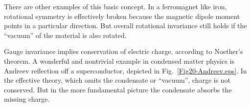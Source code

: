 \documentclass[12pt]{iopart}
\begin{document}
There are other examples of this basic concept. In a ferromagnet like iron, rotational symmetry is effectively broken because the magnetic dipole moment points in a particular direction. But overall rotational invariance still holds if the ``vacuum'' of the material is also rotated. 

Gauge invariance implies conservation of electric charge, according to Noether's theorem. A wonderful and nontrivial example in condensed matter physics is Andreev reflection off a superconductor, depicted in Fig.~\ref{Fig20-Andreev.eps}. In the effective theory, which omits the condensate or ``vacuum'', charge is not conserved. But in the more fundamental picture the condensate absorbs the missing charge.
\end{document}
